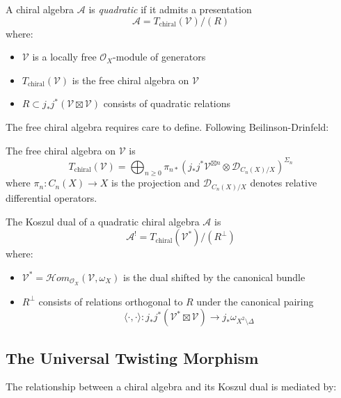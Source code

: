 \begin{definition}
A chiral algebra $\mathcal{A}$ is \emph{quadratic} if it admits a presentation
\[
\mathcal{A} = T_{\text{chiral}}(\mathcal{V})/(R)
\]
where:
\begin{itemize}
\item $\mathcal{V}$ is a locally free $\mathcal{O}_X$-module of generators
\item $T_{\text{chiral}}(\mathcal{V})$ is the free chiral algebra on $\mathcal{V}$
\item $R \subset j_*j^*(\mathcal{V} \boxtimes \mathcal{V})$ consists of quadratic relations
\end{itemize}
\end{definition}

The free chiral algebra requires care to define. Following Beilinson-Drinfeld:

\begin{definition}
The free chiral algebra on $\mathcal{V}$ is
\[
T_{\text{chiral}}(\mathcal{V}) = \bigoplus_{n \geq 0} \pi_{n*}\left(j_*j^*\mathcal{V}^{\boxtimes n} \otimes \mathcal{D}_{C_n(X)/X}\right)^{\Sigma_n}
\]
where $\pi_n: C_n(X) \to X$ is the projection and $\mathcal{D}_{C_n(X)/X}$ denotes relative differential operators.
\end{definition}

\begin{definition}
The Koszul dual of a quadratic chiral algebra $\mathcal{A}$ is
\[
\mathcal{A}^! = T_{\text{chiral}}(\mathcal{V}^*)/(R^{\perp})
\]
where:
\begin{itemize}
\item $\mathcal{V}^* = \mathcal{H}om_{\mathcal{O}_X}(\mathcal{V}, \omega_X)$ is the dual shifted by the canonical bundle
\item $R^{\perp}$ consists of relations orthogonal to $R$ under the canonical pairing
\[
\langle \cdot, \cdot \rangle: j_*j^*(\mathcal{V}^* \boxtimes \mathcal{V}) \to j_*\omega_{X^2 \setminus \Delta}
\]
\end{itemize}
\end{definition}

\subsection{The Universal Twisting Morphism}

The relationship between a chiral algebra and its Koszul dual is mediated by:


